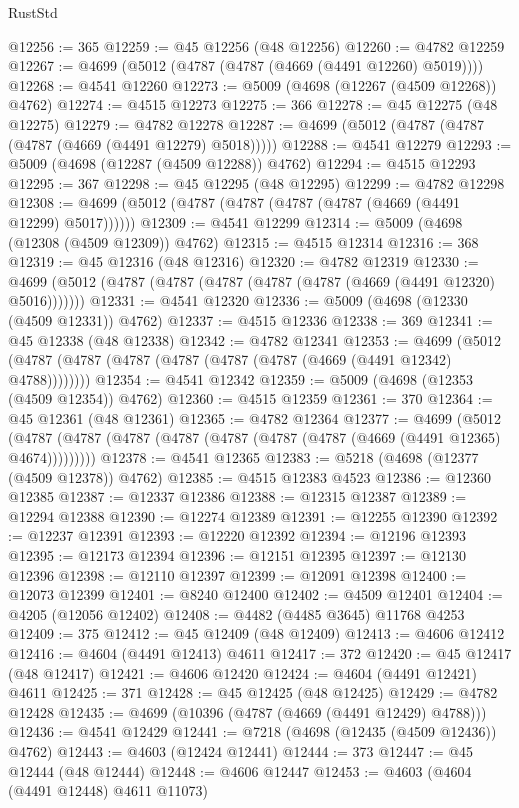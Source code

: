 \begin{lexlean}{RustStd}
\begin{coremodule}
@12256 := 365
@12259 := @45 @12256 (@48 @12256)
@12260 := @4782 @12259
@12267 := @4699 (@5012 (@4787 (@4787 (@4669 (@4491 @12260) @5019))))
@12268 := @4541 @12260
@12273 := @5009 (@4698 (@12267 (@4509 @12268)) @4762)
@12274 := @4515 @12273
@12275 := 366
@12278 := @45 @12275 (@48 @12275)
@12279 := @4782 @12278
@12287 := @4699 (@5012 (@4787 (@4787 (@4787 (@4669 (@4491 @12279) @5018)))))
@12288 := @4541 @12279
@12293 := @5009 (@4698 (@12287 (@4509 @12288)) @4762)
@12294 := @4515 @12293
@12295 := 367
@12298 := @45 @12295 (@48 @12295)
@12299 := @4782 @12298
@12308 := @4699 (@5012 (@4787 (@4787 (@4787 (@4787 (@4669 (@4491 @12299) @5017))))))
@12309 := @4541 @12299
@12314 := @5009 (@4698 (@12308 (@4509 @12309)) @4762)
@12315 := @4515 @12314
@12316 := 368
@12319 := @45 @12316 (@48 @12316)
@12320 := @4782 @12319
@12330 := @4699 (@5012 (@4787 (@4787 (@4787 (@4787 (@4787 (@4669 (@4491 @12320) @5016)))))))
@12331 := @4541 @12320
@12336 := @5009 (@4698 (@12330 (@4509 @12331)) @4762)
@12337 := @4515 @12336
@12338 := 369
@12341 := @45 @12338 (@48 @12338)
@12342 := @4782 @12341
@12353 := @4699 (@5012 (@4787 (@4787 (@4787 (@4787 (@4787 (@4787 (@4669 (@4491 @12342) @4788))))))))
@12354 := @4541 @12342
@12359 := @5009 (@4698 (@12353 (@4509 @12354)) @4762)
@12360 := @4515 @12359
@12361 := 370
@12364 := @45 @12361 (@48 @12361)
@12365 := @4782 @12364
@12377 := @4699
    (@5012 (@4787 (@4787 (@4787 (@4787 (@4787 (@4787 (@4787 (@4669 (@4491 @12365) @4674)))))))))
@12378 := @4541 @12365
@12383 := @5218 (@4698 (@12377 (@4509 @12378)) @4762)
@12385 := @4515 @12383 @4523
@12386 := @12360 @12385
@12387 := @12337 @12386
@12388 := @12315 @12387
@12389 := @12294 @12388
@12390 := @12274 @12389
@12391 := @12255 @12390
@12392 := @12237 @12391
@12393 := @12220 @12392
@12394 := @12196 @12393
@12395 := @12173 @12394
@12396 := @12151 @12395
@12397 := @12130 @12396
@12398 := @12110 @12397
@12399 := @12091 @12398
@12400 := @12073 @12399
@12401 := @8240 @12400
@12402 := @4509 @12401
@12404 := @4205 (@12056 @12402)
@12408 := @4482 (@4485 @3645) @11768 @4253
@12409 := 375
@12412 := @45 @12409 (@48 @12409)
@12413 := @4606 @12412
@12416 := @4604 (@4491 @12413) @4611
@12417 := 372
@12420 := @45 @12417 (@48 @12417)
@12421 := @4606 @12420
@12424 := @4604 (@4491 @12421) @4611
@12425 := 371
@12428 := @45 @12425 (@48 @12425)
@12429 := @4782 @12428
@12435 := @4699 (@10396 (@4787 (@4669 (@4491 @12429) @4788)))
@12436 := @4541 @12429
@12441 := @7218 (@4698 (@12435 (@4509 @12436)) @4762)
@12443 := @4603 (@12424 @12441)
@12444 := 373
@12447 := @45 @12444 (@48 @12444)
@12448 := @4606 @12447
@12453 := @4603 (@4604 (@4491 @12448) @4611 @11073)

\end{coremodule}
\end{lexlean}
